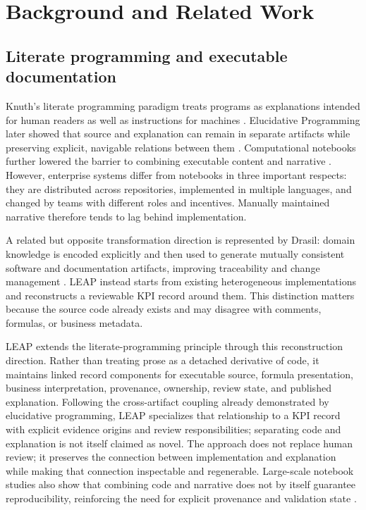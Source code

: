 \documentclass[a4paper,fleqn]{cas-dc}
\newcommand{\tool}{\textsc{LEAP}}
\begin{document}
\section{Background and Related Work}

\subsection{Literate programming and executable documentation}

Knuth's literate programming paradigm treats programs as explanations intended for human readers as well as instructions for machines \citep{Knuth1984}. Elucidative Programming later showed that source and explanation can remain in separate artifacts while preserving explicit, navigable relations between them \citep{Normark2000}. Computational notebooks further lowered the barrier to combining executable content and narrative \citep{Rule2018,Kluyver2016}. However, enterprise systems differ from notebooks in three important respects: they are distributed across repositories, implemented in multiple languages, and changed by teams with different roles and incentives. Manually maintained narrative therefore tends to lag behind implementation.

A related but opposite transformation direction is represented by Drasil: domain knowledge is encoded explicitly and then used to generate mutually consistent software and documentation artifacts, improving traceability and change management \citep{Carette2023}. LEAP instead starts from existing heterogeneous implementations and reconstructs a reviewable KPI record around them. This distinction matters because the source code already exists and may disagree with comments, formulas, or business metadata.

\tool{} extends the literate-programming principle through this reconstruction direction. Rather than treating prose as a detached derivative of code, it maintains linked record components for executable source, formula presentation, business interpretation, provenance, ownership, review state, and published explanation. Following the cross-artifact coupling already demonstrated by elucidative programming, LEAP specializes that relationship to a KPI record with explicit evidence origins and review responsibilities; separating code and explanation is not itself claimed as novel. The approach does not replace human review; it preserves the connection between implementation and explanation while making that connection inspectable and regenerable. Large-scale notebook studies also show that combining code and narrative does not by itself guarantee reproducibility, reinforcing the need for explicit provenance and validation state \citep{Pimentel2019}.
\end{document}
